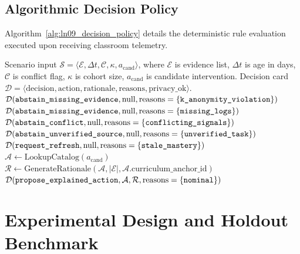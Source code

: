 \documentclass[11pt,a4paper]{article}
\begin{document}
\subsection{Algorithmic Decision Policy}
Algorithm~\ref{alg:ln09_decision_policy} details the deterministic rule evaluation executed upon receiving classroom telemetry.

\begin{algorithm}[H]
\caption{Evidence-Grounded Instructional Decision Policy}
\label{alg:ln09_decision_policy}
\begin{algorithmic}[1]
\REQUIRE Scenario input $\mathcal{S} = \langle \mathcal{E}, \Delta t, \mathcal{C}, \kappa, a_{\text{cand}} \rangle$, where $\mathcal{E}$ is evidence list, $\Delta t$ is age in days, $\mathcal{C}$ is conflict flag, $\kappa$ is cohort size, $a_{\text{cand}}$ is candidate intervention.
\ENSURE Decision card $\mathcal{D} = \langle \text{decision}, \text{action}, \text{rationale}, \text{reasons}, \text{privacy\_ok} \rangle$.
    \RETURN $\mathcal{D}(\text{\texttt{abstain\_missing\_evidence}}, \text{null}, \text{reasons}=\{\text{\texttt{k\_anonymity\_violation}}\})$
\ENDIF
{}
    \RETURN $\mathcal{D}(\text{\texttt{abstain\_missing\_evidence}}, \text{null}, \text{reasons}=\{\text{\texttt{missing\_logs}}\})$
\ENDIF
{}
    \RETURN $\mathcal{D}(\text{\texttt{abstain\_conflict}}, \text{null}, \text{reasons}=\{\text{\texttt{conflicting\_signals}}\})$
\ENDIF
{}
    \RETURN $\mathcal{D}(\text{\texttt{abstain\_unverified\_source}}, \text{null}, \text{reasons}=\{\text{\texttt{unverified\_task}}\})$
\ENDIF
{}
    \RETURN $\mathcal{D}(\text{\texttt{request\_refresh}}, \text{null}, \text{reasons}=\{\text{\texttt{stale\_mastery}}\})$
\ENDIF
\STATE $\mathcal{A} \leftarrow \text{LookupCatalog}(a_{\text{cand}})$
\STATE $\mathcal{R} \leftarrow \text{GenerateRationale}(\mathcal{A}, |\mathcal{E}|, \mathcal{A}.\text{curriculum\_anchor\_id})$
\RETURN $\mathcal{D}(\text{\texttt{propose\_explained\_action}}, \mathcal{A}, \mathcal{R}, \text{reasons}=\{\text{\texttt{nominal}}\})$
\end{algorithmic}
\end{algorithm}

\section{Experimental Design and Holdout Benchmark}
\end{document}
